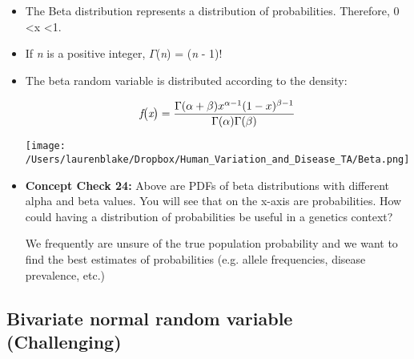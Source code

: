 \documentclass[12pt]{report}
\begin{document}
\begin{itemize}

\item The Beta distribution represents a distribution of probabilities. Therefore, 0 \textless  x \textless 1.

\item If \textit{n} is a positive integer, $\Gamma$\big(\textit{n}\big) = \big(\textit{n} - 1\big)!

\item The beta random variable is distributed according to the density:

 \begin{equation} 
\textit{f\big(x\big)} = \frac{\Gamma(\alpha + \beta)x^{\alpha-1}(1-x)^{\beta-1}}{\Gamma(\alpha)\Gamma(\beta) }
\end{equation}

\texttt{[image: /Users/laurenblake/Dropbox/Human\_Variation\_and\_Disease\_TA/Beta.png]}

\item  \textbf{Concept Check 24:} Above are PDFs of beta distributions with different alpha and beta values. You will see that on the x-axis are probabilities. How could having a distribution of probabilities be useful in a genetics context?

\color{red} We frequently are unsure of the true population probability and we want to find the best estimates of probabilities (e.g. allele frequencies, disease prevalence, etc.)

\color{black}

\end{itemize}

\subsection{Bivariate normal random variable (Challenging)}
\end{document}
